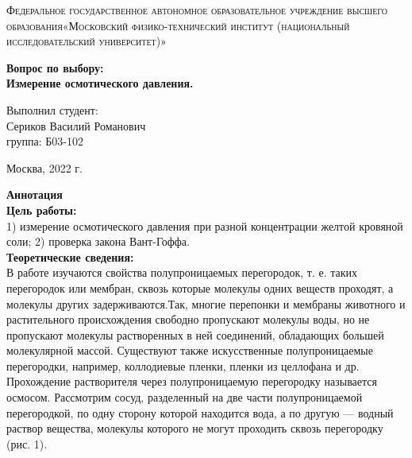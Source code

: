 \documentclass[a4paper, 12pt]{article}%
\begin{document}
	\begin{titlepage}
		\begin{center}
			\textsc{Федеральное государственное автономное образовательное учреждение высшего образования«Московский физико-технический институт (национальный исследовательский университет)»\\[5mm]
			}
			
			\vfill
			
			\textbf{Вопрос по выбору: \\[3mm]
			Измерение осмотического давления.
				\\[50mm]
			}
			
		\end{center}
		
		\hfill
		\begin{minipage}{.5\textwidth}
			Выполнил студент:\\[2mm]
			Сериков Василий Романович\\[2mm]
			группа: Б03-102\\[5mm]
			
		\end{minipage}
		\vfill
		\begin{center}
			Москва, 2022 г.
		\end{center}
		
	\end{titlepage}
	
	\newpage
	\textbf{Аннотация}\\
	
	
	\textbf{Цель работы: }\\
	
	1) измерение осмотического давления при разной
	концентрации желтой кровяной соли; 2) проверка закона Вант-Гоффа.\\
	
	
	\textbf{Теоретические сведения: } \\
	
	В работе изучаются свойства полупроницаемых перегородок, т. е. таких перегородок или мембран, сквозь
	которые молекулы одних веществ проходят, а молекулы других задерживаются.Так, многие перепонки и мембраны животного и растительного происхождения свободно пропускают молекулы воды, но не пропускают молекулы растворенных в ней соединений, обладающих большей молекулярной массой. Существуют также искусственные полупроницаемые перегородки, например, коллодиевые пленки, пленки из целлофана и др. Прохождение растворителя через полупроницаемую перегородку называется осмосом.
	Рассмотрим сосуд, разделенный на две части полупроницаемой перегородкой, по одну сторону которой находится вода,
	а по другую	— водный раствор вещества, молекулы
	которого не могут проходить сквозь перегородку (рис. 1).
	
\end{document}
